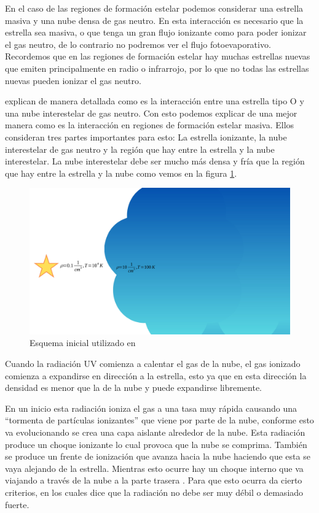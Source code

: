 \documentclass{book}
\begin{document}
En el caso de las regiones de formación estelar podemos considerar una estrella masiva y una nube densa de gas neutro. En esta interacción es necesario que la estrella sea masiva, o que tenga un gran flujo ionizante como para poder ionizar el gas neutro, de lo contrario no podremos ver el flujo fotoevaporativo. Recordemos que en las regiones de formación estelar hay muchas estrellas nuevas que emiten principalmente en radio o infrarrojo, por lo que no todas las estrellas nuevas pueden ionizar el gas neutro.

\cite{OortySpitzer_1955} explican de manera detallada como es la interacción entre una estrella tipo O y una nube interestelar de gas neutro. Con esto podemos explicar de una mejor manera como es la interacción en regiones de formación estelar masiva. Ellos consideran tres partes importantes para esto: La estrella ionizante, la nube interestelar de gas neutro y la región que hay entre la estrella y la nube interestelar. La nube interestelar debe ser mucho más densa y fría que la región que hay entre la estrella y la nube como vemos en la figura \ref{kahn_zones}.

\begin{figure}[htb]
    \centering
    \includegraphics[width= \textwidth]{artesanales/ImgFi01-5.pdf}
    \caption{Esquema inicial utilizado en \cite{Kahn:1954}}
    \label{kahn_zones}
\end{figure}

Cuando la radiación UV comienza a calentar el gas de la nube, el gas ionizado comienza a expandirse en dirección a la estrella, esto ya que en esta dirección la densidad es menor que la de la nube y puede expandirse libremente. 

En un inicio esta radiación ioniza el gas a una tasa muy rápida causando una ``tormenta de partículas ionizantes'' que viene por parte de la nube, conforme esto va evolucionando se crea una capa aislante alrededor de la nube. Esta radiación produce un choque ionizante lo cual provoca que la nube se comprima. También se produce un frente de ionización que avanza hacia la nube haciendo que esta se vaya alejando de la estrella. Mientras esto ocurre hay un choque interno que va viajando a través de la nube a la parte trasera \citep{Bertoldi_1989}. Para que esto ocurra \cite{Kahn:1954} da cierto criterios, en los cuales dice que la radiación no debe ser muy débil o demasiado fuerte.
\end{document}
